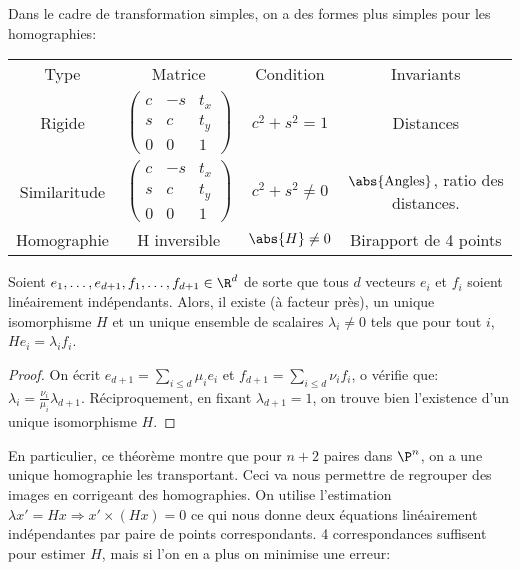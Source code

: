 \documentclass[info, math]{mpb-cours}
\begin{document}
Dans le cadre de transformation simples, on a des formes plus simples pour les homographies:
\begin{center}
  \begin{tabular}{cccc}
		Type         & Matrice                                      & Condition              & Invariants      \\
		Rigide       & $\begin{pmatrix}
				                c & -s & t_{x} \\ s & c & t_{y} \\ 0 & 0 & 1
			                \end{pmatrix}$ & $c^{2} + s^{2} = 1$    & Distances\\
		Similaritude & $ \begin{pmatrix}
				                 c & -s & t_{x} \\ s & c & t_{y} \\ 0 & 0 & 1
			                 \end{pmatrix}$ & $c^{2} + s^{2} \neq 0$ & $\abs{\text{Angles}}$, ratio des distances.\\
      Homographie & H inversible & $\abs{H} \neq 0$ & Birapport de 4 points
	\end{tabular}
\end{center}

\begin{thm}
  Soient $e_{1}, \ldots, e_{d + 1}, f_{1}, \ldots, f_{d + 1} \in \R^{d}$ de sorte que tous $d$ vecteurs $e_{i}$ et $f_{i}$ soient linéairement indépendants.
  Alors, il existe (à facteur près), un unique isomorphisme $H$ et un unique ensemble de scalaires $\lambda_{i} \neq 0$ tels que pour tout $i$, $He_{i} = \lambda_{i} f_{i}$. 
\end{thm}
\begin{proof}
  On écrit $e_{d + 1} = \sum_{i \leq d} \mu_{i} e_{i}$ et $f_{d + 1} = \sum_{i \leq d} \nu_{i}f_{i}$, o vérifie que:
  $\lambda_{i} = \frac{\nu_{i}}{\mu_{i}}\lambda_{d + 1}$.
  Réciproquement, en fixant $\lambda_{d + 1} = 1$, on trouve bien l'existence d'un unique isomorphisme $H$.
\end{proof}

En particulier, ce théorème montre que pour $n + 2$ paires dans $\P^{n}$, on a une unique homographie les transportant.
Ceci va nous permettre de regrouper des images en corrigeant des homographies.
On utilise l'estimation $\lambda x' = Hx \Rightarrow x' \times (Hx) = 0$ ce qui nous donne deux équations linéairement indépendantes par paire de points correspondants.
4 correspondances suffisent pour estimer $H$, mais si l'on en a plus on minimise une erreur: 
\end{document}
